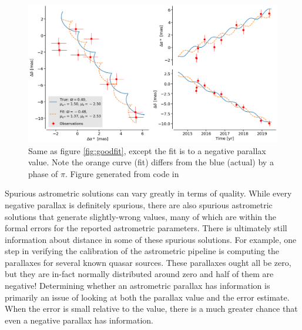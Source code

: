 \documentclass[preprint2]{aastex631}
\begin{document}
\begin{figure}
	\includegraphics[width=\columnwidth]{astrometric-bad.png}
	\caption{Same as figure \ref{fig:goodfit}, except the fit is to a negative parallax value. Note the orange curve (fit) differs from the blue (actual) by a phase of $\pi$. Figure generated from code in \cite{luriGaia2018}}
	\label{fig:badfit}
\end{figure}



Spurious astrometric solutions can vary greatly in terms of quality. While every negative parallax is definitely spurious, there are also spurious astrometric solutions that generate slightly-wrong values, many of which are within the formal errors for the reported astrometric parameters. There is ultimately still information about distance in some of these spurious solutions. For example, one step in verifying the calibration of the astrometric pipeline is computing the parallaxes for several known quasar sources\citep{luriGaia2018}. These parallaxes ought all be zero, but they are in-fact normally distributed around zero and half of them are negative! Determining whether an astrometric parallax has information is primarily an issue of looking at both the parallax value and the error estimate. When the error is small relative to the value, there is a much greater chance that even a negative parallax has information.
\end{document}
